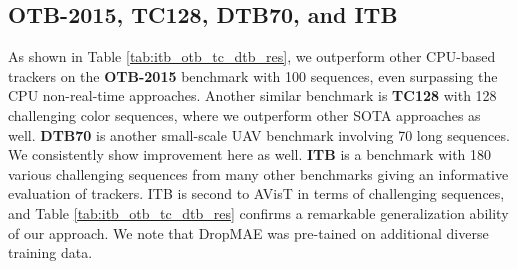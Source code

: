   \subsection{OTB-2015, TC128, DTB70, and ITB}
  As shown in Table \ref{tab:itb_otb_tc_dtb_res}, we outperform other CPU-based trackers on the \textbf{OTB-2015}\cite{7001050} benchmark with 100 sequences, even surpassing the CPU non-real-time approaches. 
  Another similar benchmark is \textbf{TC128}\cite{liang2015encoding} with 128 challenging color sequences, where we outperform other SOTA approaches as well. \textbf{DTB70}\cite{drone-tracking} is another small-scale UAV benchmark involving 70 long sequences. We consistently show improvement here as well. \textbf{ITB}\cite{li2021informative} is a benchmark with 180 various challenging sequences from many other benchmarks giving an informative evaluation of trackers. ITB is second to AVisT in terms of challenging sequences, and Table \ref{tab:itb_otb_tc_dtb_res} confirms a remarkable generalization ability of our approach. We note that DropMAE \cite{wu2023dropmae} was pre-tained on additional diverse training data.
  
  
  
